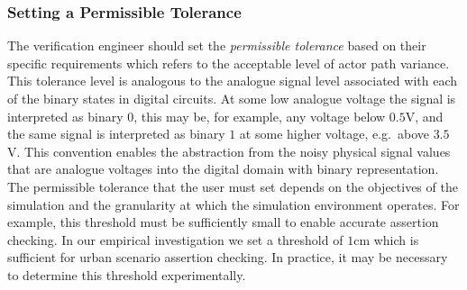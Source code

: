 \documentclass[letterpaper, 10 pt, journal, twoside]{IEEEtran}
\begin{document}
\subsubsection{Setting a Permissible Tolerance} \label{s:threshold}
The verification engineer should set the \textit{permissible tolerance} based on their specific requirements which refers to the acceptable level of actor path variance. %
This tolerance level is analogous to the analogue signal level associated with each of the binary states %
in digital circuits. At some low analogue voltage the signal is interpreted as binary $0$, this may be, for example, any voltage below $0.5$V, and the same signal is interpreted as binary $1$ at some higher voltage, e.g.\ above $3.5$V. This convention enables the abstraction from the noisy physical signal values that are analogue voltages into the digital domain with binary representation. 
%
The permissible tolerance that the user must set depends on the objectives of the simulation and the granularity at which the simulation environment operates. For example, this threshold must be sufficiently small to enable accurate assertion checking. In our empirical investigation we set a threshold of $1$cm which is sufficient for urban scenario assertion checking. In practice, it may be necessary to determine this threshold experimentally. 




\end{document}
